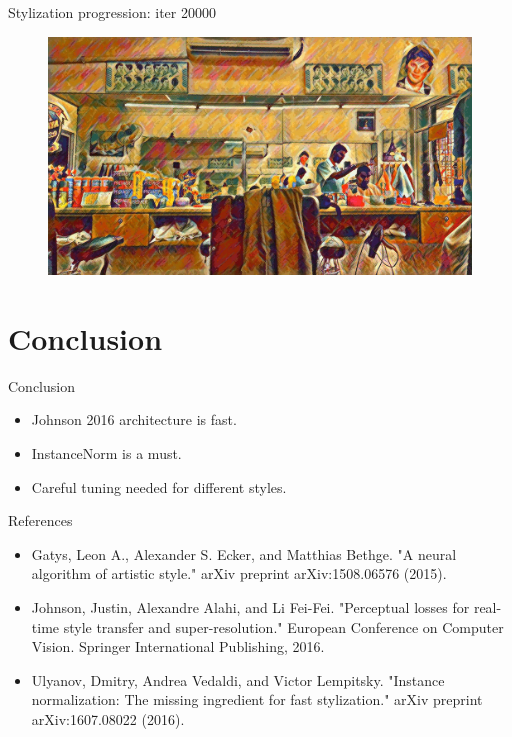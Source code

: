 \documentclass{beamer}
\begin{document}
    \begin{frame}{Stylization progression: iter 20000}

        \begin{figure}
            \includegraphics[width=\textwidth]{progression-5}
        \end{figure}

    \end{frame}

    \section{Conclusion}

    \begin{frame}{Conclusion}
        \begin{itemize}
            \item Johnson 2016 architecture is fast.
            \item InstanceNorm is a must.
            \item Careful tuning needed for different styles.
        \end{itemize}
    \end{frame}

    \begin{frame}{References}

        \begin{itemize}
            \item Gatys, Leon A., Alexander S. Ecker, and Matthias Bethge. "A neural algorithm of artistic style." arXiv preprint arXiv:1508.06576 (2015).
            \item Johnson, Justin, Alexandre Alahi, and Li Fei-Fei. "Perceptual losses for real-time style transfer and super-resolution." European Conference on Computer Vision. Springer International Publishing, 2016.
            \item Ulyanov, Dmitry, Andrea Vedaldi, and Victor Lempitsky. "Instance normalization: The missing ingredient for fast stylization." arXiv preprint arXiv:1607.08022 (2016).
        \end{itemize}
    \end{frame}
\end{document}
